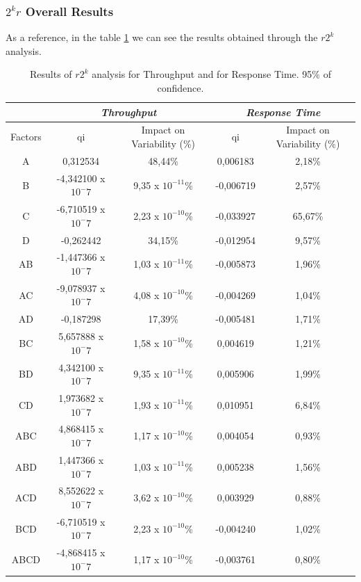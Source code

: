 \newpage
\subsubsection{$2^kr$ Overall Results}
As a reference, in the table \ref{tab: 2kr_results} we can see the results obtained through the $r2^k$ analysis.
\begin{table}[H]
	\centering
	\begin{tabular}{|c|c|c|c|c|}
		\hline
		\textbf{} & \multicolumn{2}{c|}{\textit{\textbf{Throughput}}} & \multicolumn{2}{c|}{\textit{\textbf{Response Time}}} \\ \hline
		Factors   & qi          & Impact on Variability (\%)          & qi            & Impact on Variability (\%)           \\ \hline
		A    & 0,312534      & 48,44\%    & 0,006183  & 2,18\%  \\ \hline
		B    & -4,342100 x $10^-7$ & 9,35 x $10^{-11}$\% & -0,006719 & 2,57\%  \\ \hline
		C    & -6,710519 x $10^-7$ & 2,23 x $10^{-10}$\% & -0,033927 & 65,67\% \\ \hline
		D    & -0,262442     & 34,15\%    & -0,012954 & 9,57\%  \\ \hline
		AB   & -1,447366 x $10^-7$ & 1,03 x $10^{-11}$\% & -0,005873 & 1,96\%  \\ \hline
		AC   & -9,078937 x $10^-7$ & 4,08 x $10^{-10}$\% & -0,004269 & 1,04\%  \\ \hline
		AD   & -0,187298     & 17,39\%    & -0,005481 & 1,71\%  \\ \hline
		BC   & 5,657888 x $10^-7$  & 1,58 x $10^{-10}$\% & 0,004619  & 1,21\%  \\ \hline
		BD   & 4,342100 x $10^-7$  & 9,35 x $10^{-11}$\% & 0,005906  & 1,99\%  \\ \hline
		CD   & 1,973682 x $10^-7$  & 1,93 x $10^{-11}$\% & 0,010951  & 6,84\%  \\ \hline
		ABC  & 4,868415 x $10^-7$  & 1,17 x $10^{-10}$\% & 0,004054  & 0,93\%  \\ \hline
		ABD  & 1,447366 x $10^-7$  & 1,03 x $10^{-11}$\% & 0,005238  & 1,56\%  \\ \hline
		ACD  & 8,552622 x $10^-7$  & 3,62 x $10^{-10}$\% & 0,003929  & 0,88\%  \\ \hline
		BCD  & -6,710519 x $10^-7$ & 2,23 x $10^{-10}$\% & -0,004240 & 1,02\%  \\ \hline
		ABCD & -4,868415 x $10^-7$ & 1,17 x $10^{-10}$\% & -0,003761 & 0,80\%  \\ \hline
	\end{tabular}
	\caption{Results of $r2^k$ analysis for Throughput and for Response Time. 95\% of confidence.}
	\label{tab: 2kr_results}
\end{table}
																
